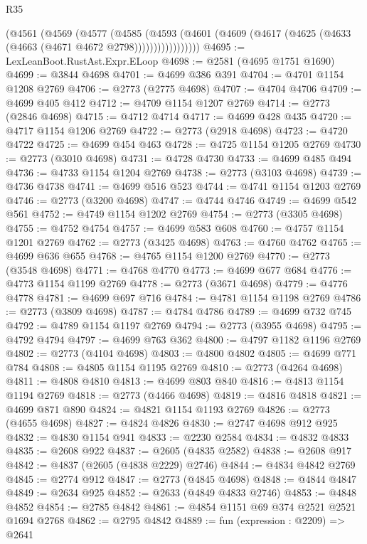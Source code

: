 \begin{lexlean}{R35}
\begin{coremodule}
              (@4561
                (@4569
                  (@4577
                    (@4585
                      (@4593
                        (@4601
                          (@4609 (@4617 (@4625 (@4633 (@4663 (@4671 @4672 @2798)))))))))))))))))
@4695 := LexLeanBoot.RustAst.Expr.ELoop
@4698 := @2581 (@4695 @1751 @1690)
@4699 := @3844 @4698
@4701 := @4699 @386 @391
@4704 := @4701 @1154 @1208 @2769
@4706 := @2773 (@2775 @4698)
@4707 := @4704 @4706
@4709 := @4699 @405 @412
@4712 := @4709 @1154 @1207 @2769
@4714 := @2773 (@2846 @4698)
@4715 := @4712 @4714
@4717 := @4699 @428 @435
@4720 := @4717 @1154 @1206 @2769
@4722 := @2773 (@2918 @4698)
@4723 := @4720 @4722
@4725 := @4699 @454 @463
@4728 := @4725 @1154 @1205 @2769
@4730 := @2773 (@3010 @4698)
@4731 := @4728 @4730
@4733 := @4699 @485 @494
@4736 := @4733 @1154 @1204 @2769
@4738 := @2773 (@3103 @4698)
@4739 := @4736 @4738
@4741 := @4699 @516 @523
@4744 := @4741 @1154 @1203 @2769
@4746 := @2773 (@3200 @4698)
@4747 := @4744 @4746
@4749 := @4699 @542 @561
@4752 := @4749 @1154 @1202 @2769
@4754 := @2773 (@3305 @4698)
@4755 := @4752 @4754
@4757 := @4699 @583 @608
@4760 := @4757 @1154 @1201 @2769
@4762 := @2773 (@3425 @4698)
@4763 := @4760 @4762
@4765 := @4699 @636 @655
@4768 := @4765 @1154 @1200 @2769
@4770 := @2773 (@3548 @4698)
@4771 := @4768 @4770
@4773 := @4699 @677 @684
@4776 := @4773 @1154 @1199 @2769
@4778 := @2773 (@3671 @4698)
@4779 := @4776 @4778
@4781 := @4699 @697 @716
@4784 := @4781 @1154 @1198 @2769
@4786 := @2773 (@3809 @4698)
@4787 := @4784 @4786
@4789 := @4699 @732 @745
@4792 := @4789 @1154 @1197 @2769
@4794 := @2773 (@3955 @4698)
@4795 := @4792 @4794
@4797 := @4699 @763 @362
@4800 := @4797 @1182 @1196 @2769
@4802 := @2773 (@4104 @4698)
@4803 := @4800 @4802
@4805 := @4699 @771 @784
@4808 := @4805 @1154 @1195 @2769
@4810 := @2773 (@4264 @4698)
@4811 := @4808 @4810
@4813 := @4699 @803 @840
@4816 := @4813 @1154 @1194 @2769
@4818 := @2773 (@4466 @4698)
@4819 := @4816 @4818
@4821 := @4699 @871 @890
@4824 := @4821 @1154 @1193 @2769
@4826 := @2773 (@4655 @4698)
@4827 := @4824 @4826
@4830 := @2747 @4698 @912 @925
@4832 := @4830 @1154 @941
@4833 := @2230 @2584
@4834 := @4832 @4833
@4835 := @2608 @922
@4837 := @2605 (@4835 @2582)
@4838 := @2608 @917
@4842 := @4837 (@2605 (@4838 @2229) @2746)
@4844 := @4834 @4842 @2769
@4845 := @2774 @912
@4847 := @2773 (@4845 @4698)
@4848 := @4844 @4847
@4849 := @2634 @925
@4852 := @2633 (@4849 @4833 @2746)
@4853 := @4848 @4852
@4854 := @2785 @4842
@4861 := @4854 @1151 @69 @374 @2521 @2521 @1694 @2768
@4862 := @2795 @4842
@4889 := fun (expression : @2209) =>
  @2641

\end{coremodule}
\end{lexlean}
